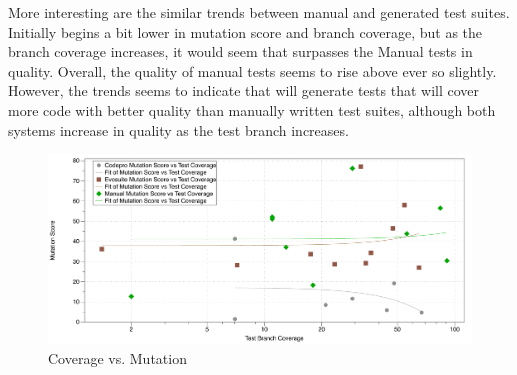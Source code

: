 More interesting are the similar trends between manual and \evo generated test suites. Initially \evo begins a bit lower in mutation score and branch coverage, but as the branch coverage increases, it would seem that \evo surpasses the Manual tests in quality. Overall, the quality of manual tests seems to rise above \evo ever so slightly. However, the trends seems to indicate that \evo will generate tests that will cover more code with better quality than manually written test suites, although both systems increase in quality as the test branch increases.

\begin{figure}[!t]
\centering
  \includegraphics[width=\textwidth]{Coverage_Mutation}
    \caption{Coverage vs. Mutation}
  \label{fig:Coverage_Mutation}
\end{figure}
